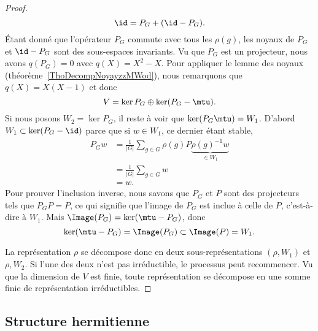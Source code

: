 \begin{proof}
\begin{equation}
		\id=P_G+(\id-P_G).
	\end{equation}
	Étant donné que l'opérateur \( P_G\) commute avec tous les \( \rho(g)\), les noyaux de \( P_G\) et \( \id-P_G\) sont des sous-espaces invariants. Vu que \( P_G\) est un projecteur, nous avons \( q(P_G)=0\) avec \( q(X)=X^2-X\). Pour appliquer le lemme des noyaux (théorème~\ref{ThoDecompNoyayzzMWod}), nous remarquons que \( q(X)=X(X-1)\) et donc
	\begin{equation}
		V=\ker P_G\oplus\ker(P_G-\mtu).
	\end{equation}
	Si nous posons \( W_2=\ker P_G\), il reste à voir que \( \ker(P_G\mtu)=W_1\). D'abord \( W_1\subset\ker(P_G-\id)\) parce que si \( w\in W_1\), ce dernier étant stable,
	\begin{subequations}
		\begin{align}
			P_Gw & =\frac{1}{ | G | }\sum_{g\in G}\rho(g)P\underbrace{\rho(g)^{-1}w}_{\in W_1} \\
			     & =\frac{1}{ | G | }\sum_{g\in G}w                                            \\
			     & =w.
		\end{align}
	\end{subequations}
	Pour prouver l'inclusion inverse, nous savons que \( P_G\) et \( P\) sont des projecteurs tels que \( P_GP=P\), ce qui signifie que l'image de \( P_G\) est inclue à celle de \( P\), c'est-à-dire à \( W_1\). Mais \( \Image(P_G)=\ker(\mtu-P_G)\), donc
	\begin{equation}
		\ker(\mtu-P_G)=\Image(P_G)\subset\Image(P)=W_1.
	\end{equation}

	La représentation \( \rho\) se décompose donc en deux sous-représentations \( (\rho,W_1)\) et \( \rho,W_2\). Si l'une des deux n'est pas irréductible, le processus peut recommencer. Vu que la dimension de \( V\) est finie, toute représentation se décompose en une somme finie de représentation irréductibles.
\end{proof}

\subsection{Structure hermitienne}

